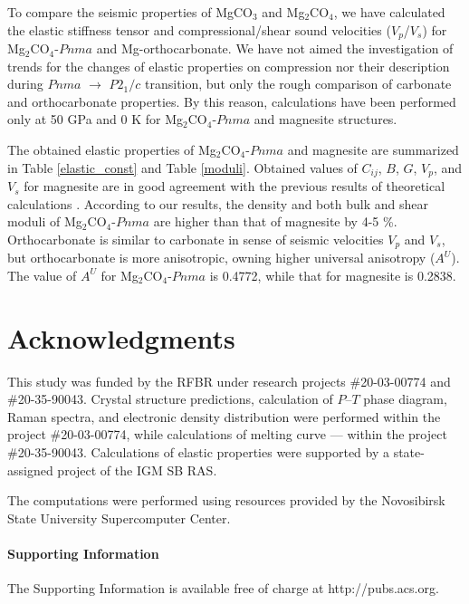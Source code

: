 \documentclass[a4paperm]{article}
\begin{document}
To compare the seismic properties of MgCO$_3$ and Mg$_2$CO$_4$, we have calculated the elastic stiffness tensor and compressional/shear sound velocities ($V_p$/$V_s$) for Mg$_2$CO$_4$-$Pnma$ and Mg-orthocarbonate.
We have not aimed the investigation of trends for the changes of elastic properties on compression nor their description during $Pnma$ $\to$ $P2_1/c$ transition, but only the rough comparison of carbonate and orthocarbonate properties.
By this reason, calculations have been performed only at 50 GPa and 0 K for Mg$_2$CO$_4$-$Pnma$ and magnesite structures.

The obtained elastic properties of Mg$_2$CO$_4$-$Pnma$ and magnesite are summarized in Table \ref{elastic_const} and Table \ref{moduli}.
Obtained values of $C_{ij}$, $B$, $G$, $V_p$, and $V_s$ for magnesite are in good agreement with the previous results of theoretical calculations \cite{li2020_mgco3}.
According to our results, the density and both bulk and shear moduli of Mg$_2$CO$_4$-$Pnma$ are higher than that of magnesite by 4-5 \%.
Orthocarbonate is similar to carbonate in sense of seismic velocities $V_p$ and $V_s$, but orthocarbonate is more anisotropic, owning higher universal anisotropy ($A^U$).
The value of $A^U$ for Mg$_2$CO$_4$-$Pnma$ is 0.4772, while that for magnesite is 0.2838.


\section*{Acknowledgments}
This study was funded by the RFBR under research projects \#20-03-00774 and \#20-35-90043.
Crystal structure predictions, calculation of $P$--$T$ phase diagram, Raman spectra, and electronic density distribution were performed within the project \#20-03-00774, while calculations of melting curve --- within the project \#20-35-90043.
Calculations of elastic properties were supported by a state-assigned project of the IGM SB RAS. 

The computations were performed using resources provided by the Novosibirsk State University Supercomputer Center.

\paragraph{Supporting Information}

The Supporting Information is available free of charge at http://pubs.acs.org.
\end{document}
